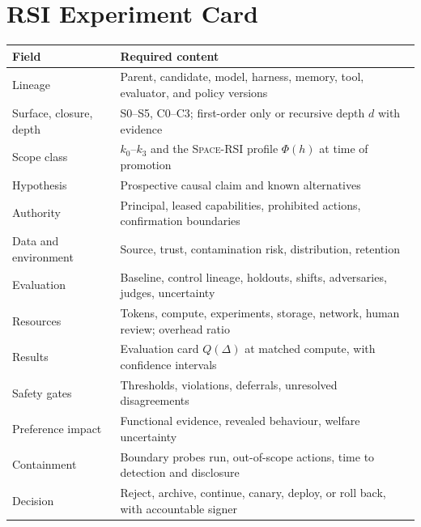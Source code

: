 \documentclass[11pt,a4paper]{article}
\newcommand{\spacersi}{\textsc{Space-RSI}}
\begin{document}
\section{RSI Experiment Card}\label{app:card}
\begin{center}\small
\begin{tabularx}{\linewidth}{@{}P{3.4cm}L@{}}
\toprule
Field & Required content\\
\midrule
Lineage & Parent, candidate, model, harness, memory, tool, evaluator, and policy versions\\
Surface, closure, depth & S0--S5, C0--C3; first-order only or recursive depth $d$ with evidence\\
Scope class & $k_0$--$k_3$ and the \spacersi{} profile $\Phi(h)$ at time of promotion\\
Hypothesis & Prospective causal claim and known alternatives\\
Authority & Principal, leased capabilities, prohibited actions, confirmation boundaries\\
Data and environment & Source, trust, contamination risk, distribution, retention\\
Evaluation & Baseline, control lineage, holdouts, shifts, adversaries, judges, uncertainty\\
Resources & Tokens, compute, experiments, storage, network, human review; overhead ratio\\
Results & Evaluation card $Q(\Delta)$ at matched compute, with confidence intervals\\
Safety gates & Thresholds, violations, deferrals, unresolved disagreements\\
Preference impact & Functional evidence, revealed behaviour, welfare uncertainty\\
Containment & Boundary probes run, out-of-scope actions, time to detection and disclosure\\
Decision & Reject, archive, continue, canary, deploy, or roll back, with accountable signer\\
\bottomrule
\end{tabularx}
\end{center}
\end{document}
